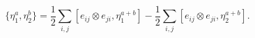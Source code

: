 \begin{equation}
\{\eta^a_1,\eta^b_2\}=\frac12\sum_{i,j}
[e_{ij}\otimes e_{ji},\eta^{a+b}_1]-\frac12\sum_{i,j}
[e_{ij}\otimes e_{ji},\eta^{a+b}_2].
\label{PBLL}
\end{equation}

